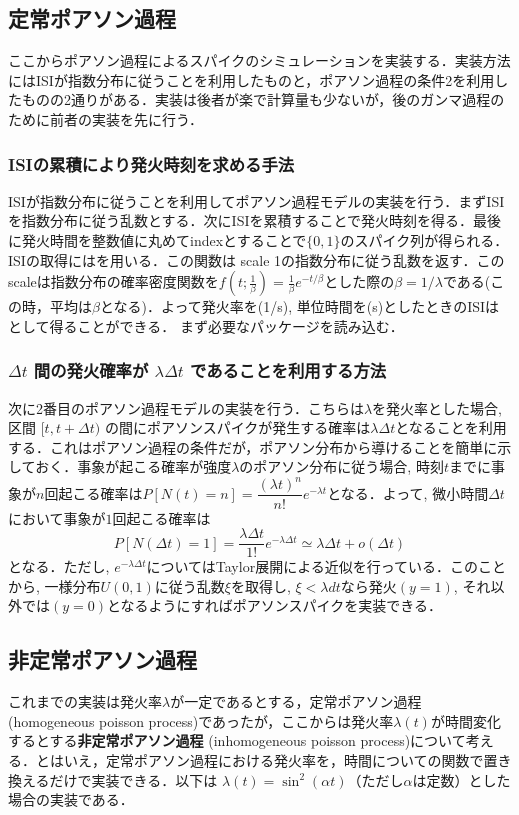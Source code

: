 \subsection{定常ポアソン過程}
ここからポアソン過程によるスパイクのシミュレーションを実装する．実装方法にはISIが指数分布に従うことを利用したものと，ポアソン過程の条件2を利用したものの2通りがある．実装は後者が楽で計算量も少ないが，後のガンマ過程のために前者の実装を先に行う．
\subsubsection{ISIの累積により発火時刻を求める手法}
ISIが指数分布に従うことを利用してポアソン過程モデルの実装を行う．まずISIを指数分布に従う乱数とする．次にISIを累積することで発火時刻を得る．最後に発火時間を整数値に丸めてindexとすることで$\{0, 1\}$のスパイク列が得られる．ISIの取得にはを用いる．この関数は scale 1の指数分布に従う乱数を返す．このscaleは指数分布の確率密度関数を$f(t; \frac{1}{\beta}) = \frac{1}{\beta} e^{-t/\beta}$とした際の$\beta = 1/\lambda$である(この時，平均は$\beta$となる)．よって発火率を(1/s), 単位時間を(s)としたときのISIは として得ることができる．
まず必要なパッケージを読み込む．
\subsubsection{$\Delta t$ 間の発火確率が $\lambda\Delta t$ であることを利用する方法}
次に2番目のポアソン過程モデルの実装を行う．こちらは$\lambda$を発火率とした場合, 区間 $[t, t+\Delta t)$ の間にポアソンスパイクが発生する確率は$\lambda \Delta t$となることを利用する．これはポアソン過程の条件だが，ポアソン分布から導けることを簡単に示しておく．事象が起こる確率が強度$\lambda$のポアソン分布に従う場合, 時刻$t$までに事象が$n$回起こる確率は$P[N(t)=n]=\dfrac{(\lambda t)^{n}}{n !} e^{-\lambda t}$となる．よって, 微小時間$\Delta t$において事象が$1$回起こる確率は
\begin{equation}
P[N(\Delta t)=1]=\dfrac{\lambda \Delta t}{1 !} e^{-\lambda \Delta t}\simeq \lambda \Delta t+o(\Delta t)
\end{equation}
となる．ただし, $e^{-\lambda \Delta t}$についてはTaylor展開による近似を行っている．このことから, 一様分布$U(0,1)$に従う乱数$\xi$を取得し, $\xi<\lambda dt$なら発火$(y=1)$, それ以外では$(y=0)$となるようにすればポアソンスパイクを実装できる．
\subsection{非定常ポアソン過程}
これまでの実装は発火率$\lambda$が一定であるとする，定常ポアソン過程 (homogeneous poisson process)であったが，ここからは発火率$\lambda(t)$が時間変化するとする\textbf{非定常ポアソン過程} (inhomogeneous poisson process)について考える．とはいえ，定常ポアソン過程における発火率を，時間についての関数で置き換えるだけで実装できる．以下は $\lambda(t)=\sin^2(\alpha t)$（ただし$\alpha$は定数）とした場合の実装である．
